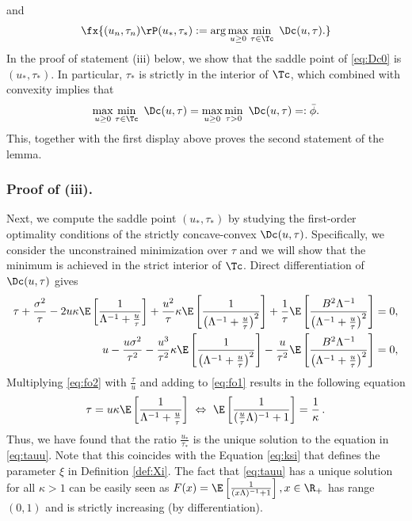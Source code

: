 and 
\begin{align}\label{eq:Dc}
\fx{(u_n,\tau_n) \rP (u_*,\tau_*):=\arg\max_{u\geq 0}\min_{\tau\in\Tc}~ \Dc(u,\tau).}
\end{align}
In the proof of statement (iii) below, we show that the saddle point of \eqref{eq:Dc0} is $(u_*,\tau_*)$. In particular, $\tau_*$ is strictly in the interior of $\Tc$, which combined with convexity implies that
$$
 \max_{u\geq 0}\min_{\tau\in\Tc}~ \Dc(u,\tau) =  \max_{u\geq 0}\min_{\tau>0}~ \Dc(u,\tau) =: \bar\phi.
$$
This, together with the first display above proves the second statement of the lemma.

\vspace{5pt}
\subsubsection{Proof of (iii).}  Next, we compute the saddle point $(u_*,\tau_*)$ by studying the first-order optimality conditions of the strictly concave-convex $\Dc(u,\tau)$. Specifically, we consider the unconstrained minimization over $\tau$ and we will show that the minimum is achieved in the strict interior of $\Tc$. Direct differentiation of $\Dc(u,\tau)$ gives
\begin{subequations}
\begin{align}
{\tau} + \frac{\sigma^2}{\tau} - 2u\kappa\E\left[ \frac{1}{\Lambda^{-1}+\frac{u}{\tau}} \right] + \frac{u^2}{\tau}\kappa \E\left[ \frac{1}{\left(\Lambda^{-1}+\frac{u}{\tau}\right)^2}\right] + \frac{1}{\tau}\E\left[\frac{B^2\Lambda^{-1}}{\left(\Lambda^{-1}+\frac{u}{\tau}\right)^2}\right] &= 0, \label{eq:fo1}\\
{u} - \frac{u\sigma^2}{\tau^2} - \frac{u^3}{\tau^2}\kappa \E\left[ \frac{1}{\left(\Lambda^{-1} + \frac{u}{\tau}\right)^2}\right] - \frac{u}{\tau^2} \E\left[\frac{B^2\Lambda^{-1}}{\left(\Lambda^{-1}+\frac{u}{\tau}\right)^2}\right] &= 0,\label{eq:fo2}
\end{align}
\end{subequations}
Multiplying \eqref{eq:fo2}  with $\frac{\tau}{u}$ and adding to \eqref{eq:fo1} results in the following equation
\begin{align}
\tau = u\kappa\E\left[ \frac{1}{\Lambda^{-1}+\frac{u}{\tau}} \right] ~\Leftrightarrow ~
\E\left[ \frac{1}{(\frac{u}{\tau}\Lambda)^{-1}+1} \right] = \frac{1}{\kappa} \label{eq:tauu}\,.
\end{align}
Thus, we have found that the ratio $\frac{u_*}{\tau_*}$ is the unique solution to the equation in \eqref{eq:tauu}. Note that this coincides with the Equation \eqref{eq:ksi} that defines the parameter $\xi$ in Definition \ref{def:Xi}.  The fact that \eqref{eq:tauu} has a unique solution for all $\kappa>1$ can be easily seen as $F(x)=\E\left[ \frac{1}{(x\Lambda)^{-1}+1} \right], x\in\R_+$ has range $(0,1)$ and is strictly increasing (by differentiation). 


